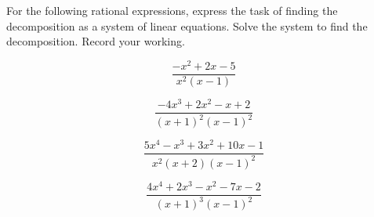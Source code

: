 \begin{OmitV1}
\begin{exercise}  
For the following rational expressions, express the task of finding the  decomposition as a system of linear equations.
Solve the system to find the decomposition.  
Record your working.
\begin{Parts}
\item 
\begin{equation*}
\frac{-x^2+2x-5}{x^2(x-1)}
\end{equation*}

\item 
\begin{equation*}
\frac{-4x^3+2x^2-x+2}{(x+1)^2(x-1)^2}
\end{equation*}

\item 
\begin{equation*}
\frac{5x^4-x^3+3x^2+10x-1}{x^2(x+2)(x-1)^2}
\end{equation*}


\item 
\begin{equation*}
\frac{4x^4+2x^3-x^2-7x-2}{(x+1)^3(x-1)^2}
\end{equation*}

\end{Parts}
\end{exercise}
\end{OmitV1}





